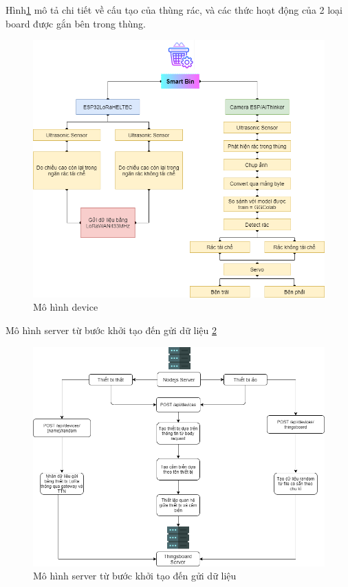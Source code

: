 Hình\ref{fig:chart_smartbin} mô tả chi tiết về cấu tạo của thùng rác, và các thức hoạt động của 2 loại board được gắn bên trong thùng. 
\begin{figure}[H]
    \centering
    \includegraphics[width=\textwidth]{images/Chart_smartbin.png}
    \caption{Mô hình device}
    \label{fig:chart_smartbin}
\end{figure}


Mô hình server từ bước khởi tạo đến gửi dữ liệu \ref{fig:chart_server1}
\begin{figure}[H]
    \centering
    \includegraphics[width=\textwidth]{images/Khanh/Nodejs/Chart_server1.png}
    \caption{Mô hình server từ bước khởi tạo đến gửi dữ liệu}
    \label{fig:chart_server1}
\end{figure}

